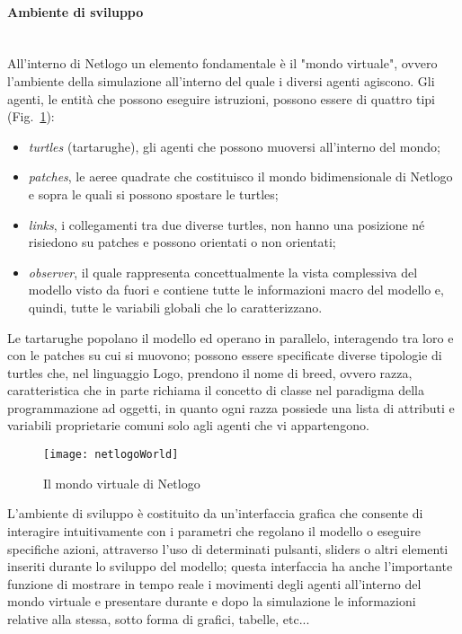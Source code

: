 \documentclass[12pt,a4paper,openright,twoside]{report}
\newcommand{\myparagraph}[1]{\paragraph{#1}\mbox{}\\}
\begin{document}
\myparagraph{Ambiente di sviluppo}

All'interno di Netlogo un elemento fondamentale è il "mondo virtuale", ovvero l'ambiente della simulazione all'interno del quale i diversi agenti agiscono. Gli agenti, le entità che possono eseguire istruzioni, possono essere di quattro tipi (Fig.~\ref{netlogoWorld}): \begin{itemize}
\item \emph{turtles} (tartarughe), gli agenti che possono muoversi all'interno del mondo;
\item \emph{patches}, le aeree quadrate che costituisco il mondo bidimensionale di Netlogo e sopra le quali si possono spostare le turtles;
\item \emph{links}, i collegamenti tra due diverse turtles, non hanno una posizione né risiedono su patches e possono orientati o non orientati;
\item \emph{observer}, il quale rappresenta concettualmente la vista complessiva del modello visto da fuori e contiene tutte le informazioni macro del modello e, quindi, tutte le variabili globali che lo caratterizzano.
\end{itemize}
Le tartarughe popolano il modello ed operano in parallelo, interagendo tra loro e con le patches su cui si muovono; possono essere specificate diverse tipologie di turtles che, nel linguaggio Logo, prendono il nome di breed, ovvero razza, caratteristica che in parte richiama il concetto di classe nel paradigma della programmazione ad oggetti, in quanto ogni razza possiede una lista di attributi e variabili proprietarie comuni solo agli agenti che vi appartengono.

\begin{figure}[H]
	\begin{center}
	\texttt{[image: netlogoWorld]}
	\end{center}
	\caption{Il mondo virtuale di Netlogo}
  	\label{netlogoWorld}
\end{figure}

L'ambiente di sviluppo è costituito da un'interfaccia grafica che consente di interagire intuitivamente con i parametri che regolano il modello o eseguire specifiche azioni, attraverso l'uso di determinati pulsanti, sliders o altri elementi inseriti durante lo sviluppo del modello; questa interfaccia ha anche l'importante funzione di mostrare in tempo reale i movimenti degli agenti all'interno del mondo virtuale e presentare durante e dopo la simulazione le informazioni relative alla stessa, sotto forma di grafici, tabelle, etc...
\end{document}
